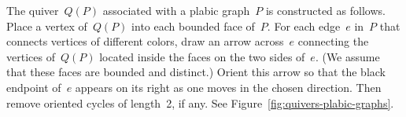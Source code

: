 \begin{definition}
\label{def:Q(P)}
The quiver~$Q(P)$ associated with a plabic graph~$P$ is constructed as follows.
Place a vertex of~$Q(P)$ into each bounded face of~$P$.
For each edge~$e$ in~$P$ that connects vertices of different colors,
draw an arrow across~$e$ connecting the vertices of~$Q(P)$ located inside the faces 
on the two sides of~$e$. (We assume that these faces are bounded and distinct.) 
Orient this arrow so that the black endpoint of~$e$ appears on its right as one moves
in the chosen direction. 
Then remove oriented cycles of length~2, if any. 
See Figure~\ref{fig:quivers-plabic-graphs}.
\end{definition}


